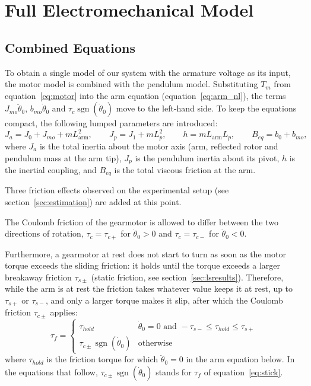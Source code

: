 \documentclass[a4paper,11pt]{article}
\newcommand{\La}{L_{\mathrm{arm}}}
\newcommand{\sgn}{\operatorname{sgn}}
\begin{document}
\section{Full Electromechanical Model}
\label{sec:full}

\subsection{Combined Equations}
To obtain a single model of our system with the armature voltage as its input, the motor model is combined with the pendulum model. Substituting $T_m$ from equation~\ref{eq:motor} into the arm equation (equation~\ref{eq:arm_nl}), the terms $J_{mo}\ddot\theta_0$, $b_{mo}\dot\theta_0$ and $\tau_c \sgn(\dot\theta_0)$ move to the left-hand side. To keep the equations compact, the following lumped parameters are introduced:
\begin{equation}
  J_a = J_0 + J_{mo} + m \La^2, \qquad J_p = J_1 + m L_p^2, \qquad h = m \La L_p, \qquad B_{eq} = b_0 + b_{mo} ,
  \label{eq:short}
\end{equation}
where $J_a$ is the total inertia about the motor axis (arm, reflected rotor and pendulum mass at the arm tip), $J_p$ is the pendulum inertia about its pivot, $h$ is the inertial coupling, and $B_{eq}$ is the total viscous friction at the arm.

Three friction effects observed on the experimental setup (see section~\ref{sec:estimation}) are added at this point.

The Coulomb friction of the gearmotor is allowed to differ between the two directions of rotation, $\tau_c = \tau_{c+}$ for $\dot\theta_0 > 0$ and $\tau_c = \tau_{c-}$ for $\dot\theta_0 < 0$.

Furthermore, a gearmotor at rest does not start to turn as soon as the motor torque exceeds the sliding friction: it holds until the torque exceeds a larger breakaway friction $\tau_{s\pm}$ (static friction, see section~\ref{sec:lsresults}). Therefore, while the arm is at rest the friction takes whatever value keeps it at rest, up to $\tau_{s+}$ or $\tau_{s-}$, and only a larger torque makes it slip, after which the Coulomb friction $\tau_{c\pm}$ applies:
\begin{equation}
  \tau_f = \begin{cases} \tau_{hold} & \dot\theta_0 = 0 \text{ and } -\tau_{s-} \le \tau_{hold} \le \tau_{s+} \\ \tau_{c\pm} \sgn(\dot\theta_0) & \text{otherwise} \end{cases}
  \label{eq:stick}
\end{equation}
where $\tau_{hold}$ is the friction torque for which $\ddot\theta_0 = 0$ in the arm equation below. In the equations that follow, $\tau_{c\pm} \sgn(\dot\theta_0)$ stands for $\tau_f$ of equation~\ref{eq:stick}.
\end{document}
